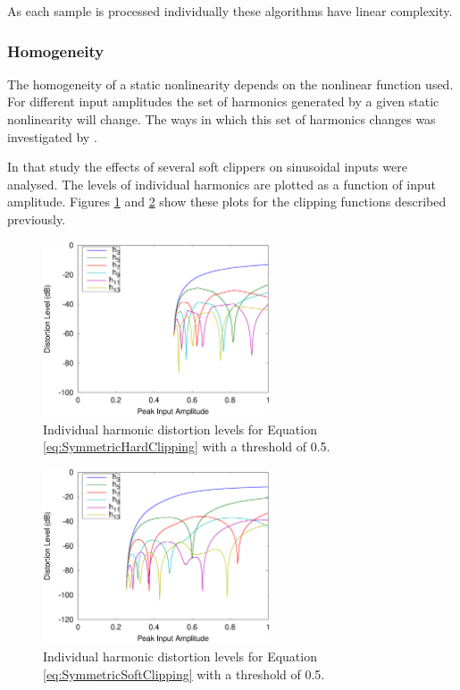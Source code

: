 			As each sample is processed individually these algorithms have linear complexity.

		\subsubsection*{Homogeneity}
			The homogeneity of a static nonlinearity depends on the nonlinear function used. For different
			input amplitudes the set of harmonics generated by a given static nonlinearity will change. The
			ways in which this set of harmonics changes was investigated by \citet{enderby2012harmonic}.

			In that study the effects of several soft clippers on sinusoidal inputs were analysed. The levels
			of individual harmonics are plotted as a function of input amplitude. Figures
			\ref{fig:HardClippingHarmonics} and \ref{fig:SoftClippingHarmonics} show these plots for the
			clipping functions described previously.

			\begin{figure}[h!]
				\centering
				\includegraphics[width=0.6\textwidth]{chapter3/Images/HardClippingHarmonics.eps}
				\caption{Individual harmonic distortion levels for Equation \ref{eq:SymmetricHardClipping}
					 with a threshold of 0.5.}
				\label{fig:HardClippingHarmonics}
			\end{figure}

			\begin{figure}[h!]
				\centering
				\includegraphics[width=0.6\textwidth]{chapter3/Images/SoftClippingHarmonics.eps}
				\caption{Individual harmonic distortion levels for Equation \ref{eq:SymmetricSoftClipping}
					 with a threshold of 0.5.}
				\label{fig:SoftClippingHarmonics}
			\end{figure}

